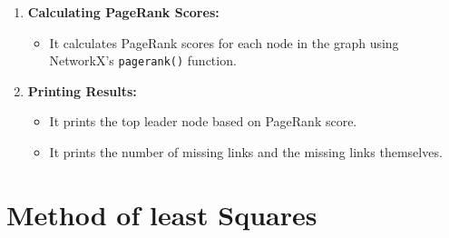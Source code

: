\documentclass{article}
\begin{document}
\begin{enumerate}
    \item \textbf{Calculating PageRank Scores:}
    \begin{itemize}
        \item It calculates PageRank scores for each node in the graph using NetworkX's \texttt{pagerank()} function.
    \end{itemize}
    
    \item \textbf{Printing Results:}
    \begin{itemize}
        \item It prints the top leader node based on PageRank score.
        \item It prints the number of missing links and the missing links themselves.
    \end{itemize}
\end{enumerate}

\section{Method of least Squares}
\end{document}
